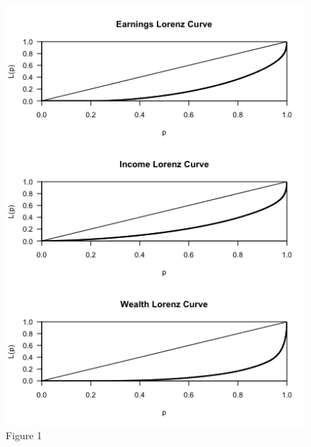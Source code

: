 \documentclass[11pt]{article}
\begin{document}
\begin{enumerate}
\begin{figure}[t]
	\includegraphics[width=1\textwidth]{LC.png}
\caption{Figure 1}
	\label{fig:figure1}
\end{figure}





\end{enumerate}
\end{document}
